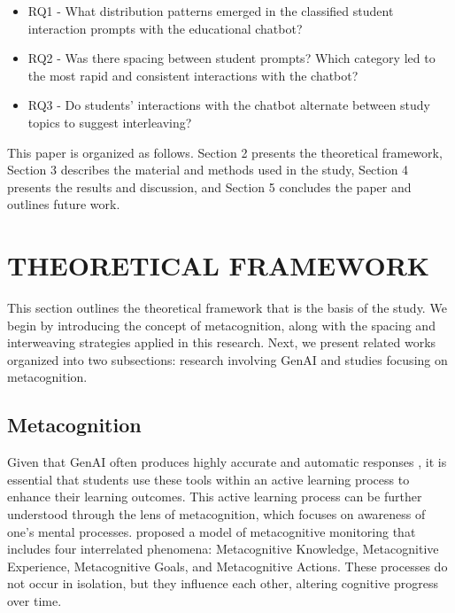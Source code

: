 \documentclass[a4paper,twoside]{article}
\begin{document}
\begin{itemize}
  \item RQ1 - What distribution patterns emerged in the classified student
  interaction prompts with the educational chatbot?
  \item RQ2 - Was there spacing between student prompts? Which category led to
  the most rapid and consistent interactions with the chatbot?
  \item RQ3 - Do students' interactions with the chatbot alternate between study
  topics to suggest interleaving?
\end{itemize}

This paper is organized as follows. Section 2 presents the theoretical
framework, Section 3 describes the material and methods used in the study,
Section 4 presents the results and discussion, and Section 5 concludes the
paper and outlines future work.

\section{\uppercase{Theoretical Framework}}

This section outlines the theoretical framework that is the basis of the study.
We begin by introducing the concept of metacognition, along with the spacing and
interweaving strategies applied in this research. Next, we present related works
organized into two subsections: research involving GenAI and studies focusing
on metacognition.

\subsection{Metacognition}

Given that GenAI often produces highly accurate and automatic responses
\citep{Puryear22}, it is essential that students use these tools within an
active learning process to enhance their learning outcomes. This active
learning process can be further understood through the lens of metacognition,
which focuses on awareness of one's mental processes. \cite{flavell79}
proposed a model of metacognitive monitoring that includes four interrelated
phenomena: Metacognitive Knowledge, Metacognitive Experience, Metacognitive
Goals, and Metacognitive Actions. These processes do not occur in isolation, but
they influence each other, altering cognitive progress over time.
\end{document}
